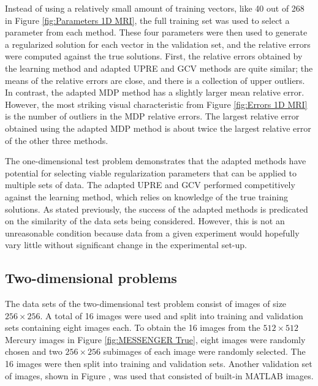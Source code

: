 \documentclass[12pt]{article}
\begin{document}
\noindent Instead of using a relatively small amount of training vectors, like 40 out of 268 in Figure \ref{fig:Parameters 1D MRI}, the full training set was used to select a parameter from each method. These four parameters were then used to generate a regularized solution for each vector in the validation set, and the relative errors were computed against the true solutions. First, the relative errors obtained by the learning method and adapted UPRE and GCV methods are quite similar; the means of the relative errors are close, and there is a collection of upper outliers. In contrast, the adapted MDP method has a slightly larger mean relative error. However, the most striking visual characteristic from Figure \ref{fig:Errors 1D MRI} is the number of outliers in the MDP relative errors. The largest relative error obtained using the adapted MDP method is about twice the largest relative error of the other three methods. \par 
The one-dimensional test problem demonstrates that the adapted methods have potential for selecting viable regularization parameters that can be applied to multiple sets of data. The adapted UPRE and GCV performed competitively against the learning method, which relies on knowledge of the true training solutions. As stated previously, the success of the adapted methods is predicated on the similarity of the data sets being considered. However, this is not an unreasonable condition because data from a given experiment would hopefully vary little without significant change in the experimental set-up.

\subsection{Two-dimensional problems} \label{sec:2D}

The data sets of the two-dimensional test problem consist of images of size $256 \times 256$. A total of 16 images were used and split into training and validation sets containing eight images each. To obtain the 16 images from the $512 \times 512$ Mercury images in Figure \ref{fig:MESSENGER True}, eight images were randomly chosen and two $256 \times 256$ subimages of each image were randomly selected. The 16 images were then split into training and validation sets. Another validation set of images, shown in Figure , was used that consisted of built-in MATLAB images.
\end{document}
